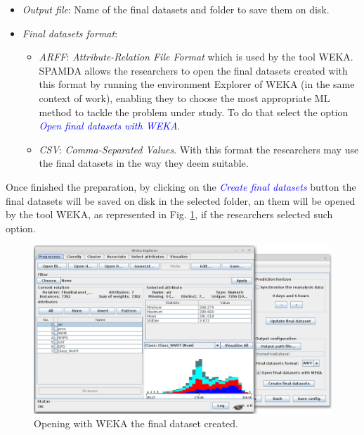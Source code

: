 \begin{onehalfspace}
\begin{itemize}
					\item \textit{Output file}: Name of the final datasets and folder to save them on disk.
						
					\item \textit{Final datasets format}:

						\begin{itemize}
						
							\item \textit{ARFF}: \textit{Attribute-Relation File Format} \cite{WEKA_ARFF} which is used by the tool WEKA. SPAMDA allows the researchers to open the final datasets created with this format by running the environment Explorer of WEKA (in the same context of work), enabling they to choose the most appropriate ML method to tackle the problem under study. To do that select the option \textcolor{blue}{\textit{Open final datasets with WEKA}}.

							\item \textit{CSV}: \textit{Comma-Separated Values}. With this format the researchers may use the final datasets in the way they deem suitable.
							
						\end{itemize}
					
				\end{itemize}
				
				Once finished the preparation, by clicking on the \textcolor{blue}{\textit{Create final datasets}} button the final datasets will be saved on disk in the selected folder, an them will be opened by the tool WEKA, as represented in Fig. \ref{fig:openigFinalDatasetWeka}, if the researchers selected such option.
				
				\begin{figure}[ht!]
					\centering
					\includegraphics[scale=0.375]{figures/openigFinalDatasetWeka.png}
					\caption{Opening with WEKA the final dataset created.}
					\label{fig:openigFinalDatasetWeka}
				\end{figure}
				

\end{onehalfspace}

